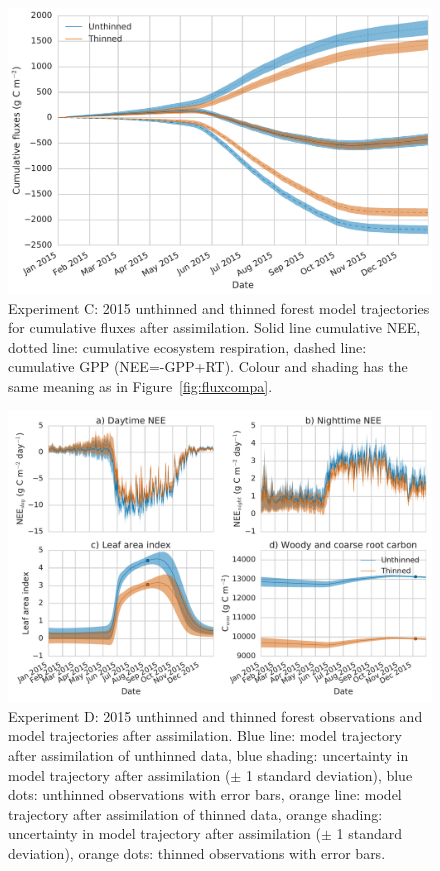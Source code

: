 \documentclass[draft,jgrga]{agutexSI}
\begin{document}
  \begin{figure}
 \noindent\includegraphics[width=40pc]{cum_fluxc.pdf}
\caption{Experiment C: 2015 unthinned and thinned forest model trajectories for cumulative fluxes after assimilation. Solid line cumulative NEE, dotted line: cumulative ecosystem respiration, dashed line: cumulative GPP (NEE=-GPP+RT). Colour and shading has the same meaning as in Figure~\ref{fig:fluxcompa}.}
 \label{fig:fluxcumc}
 \end{figure}
 
 
  \begin{figure}
 \noindent\includegraphics[width=40pc]{obs_compd.pdf}
\caption{Experiment D: 2015 unthinned and thinned forest observations and model trajectories after assimilation. Blue line: model trajectory after assimilation of unthinned data, blue shading: uncertainty in model trajectory after assimilation (\(\pm\) 1 standard deviation), blue dots: unthinned observations with error bars, orange line: model trajectory after assimilation of thinned data, orange shading: uncertainty in model trajectory after assimilation (\(\pm\) 1 standard deviation), orange dots: thinned observations with error bars.}
 \label{fig:obscompd}
 \end{figure}
 
\end{document}
